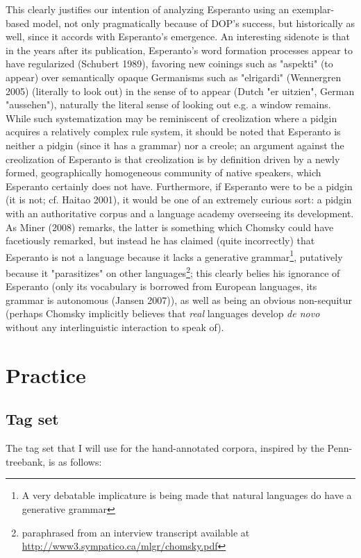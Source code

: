 \documentclass[10pt,a4paper]{article}
\begin{document}
This clearly justifies our intention of analyzing Esperanto using an
exemplar-based model, not only pragmatically because of DOP's success, but
historically as well, since it accords with Esperanto's emergence. An
interesting sidenote is that in the years after its publication, Esperanto's
word formation processes appear to have regularized (Schubert 1989), favoring
new coinings such as "aspekti" (to appear) over semantically opaque Germanisms
such as "elrigardi" (Wennergren 2005) (literally to look out) in the sense of
to appear (Dutch "er uitzien", German "aussehen"), naturally the literal sense
of looking out e.g. a window remains. While such systematization may be reminiscent of
creolization where a pidgin acquires a relatively complex rule system, it should be
noted that Esperanto is neither a pidgin (since it has a grammar) nor a creole; an
argument against the creolization of Esperanto is that creolization
is by definition driven by a newly formed, geographically homogeneous community
of native speakers, which Esperanto certainly does not have. Furthermore, if
Esperanto were to be a pidgin (it is not; cf.  Haitao 2001), it would be one of
an extremely curious sort: a pidgin with an authoritative corpus and a language
academy overseeing its development. As Miner (2008) remarks, the latter is
something which Chomsky could have facetiously remarked, but instead he has claimed
(quite incorrectly) that Esperanto is not a language because it lacks a generative
grammar\footnote{A very debatable implicature is being made that natural languages do have a generative grammar}, putatively because it "parasitizes" on other
languages\footnote{paraphrased from an interview transcript available at
\url{http://www3.sympatico.ca/mlgr/chomsky.pdf}}; this clearly belies his
ignorance of Esperanto (only its vocabulary is borrowed from European
languages, its grammar is autonomous (Jansen 2007)), as well as being an
obvious non-sequitur (perhaps Chomsky implicitly believes that {\em real}
languages develop {\em de novo} without any interlinguistic interaction to
speak of).

\section{Practice}
\subsection{Tag set}

The tag set that I will use for the hand-annotated corpora, 
inspired by the Penn-treebank, is as follows:
\end{document}
